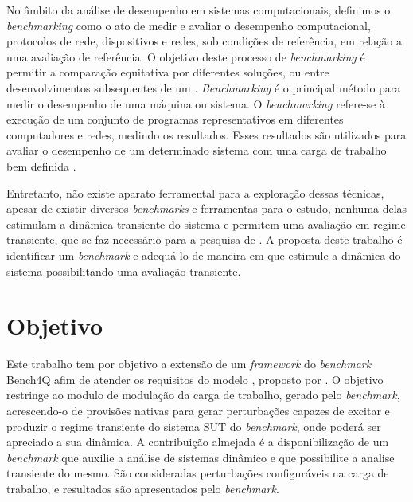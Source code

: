 No âmbito da análise de desempenho em sistemas computacionais, definimos o \textit{benchmarking} como o ato de medir e avaliar o desempenho computacional, protocolos de rede, dispositivos e redes, sob condições de referência, em relação a uma avaliação de referência. O objetivo deste processo de \textit{benchmarking} é permitir a comparação equitativa por diferentes soluções, ou entre desenvolvimentos subsequentes de um \textit{}. \textit{Benchmarking} é o principal método para medir o desempenho de uma máquina ou sistema. O \textit{benchmarking} refere-se à execução de um conjunto de programas representativos em diferentes computadores e redes, medindo os resultados. Esses resultados são utilizados para avaliar o desempenho de um determinado sistema com uma carga de trabalho bem definida \cite{Menasce2001}.

Entretanto, não existe aparato ferramental para a exploração dessas técnicas, apesar de existir diversos \textit{benchmarks} e ferramentas para o estudo, nenhuma delas estimulam a dinâmica transiente do sistema e permitem uma avaliação em regime transiente, que se faz necessário para a pesquisa de . A proposta deste trabalho é identificar um \textit{benchmark} e adequá-lo de maneira em que estimule a dinâmica do sistema possibilitando uma avaliação transiente.


\section{Objetivo}
Este trabalho tem por objetivo a extensão de um \textit{framework} do \textit{benchmark} Bench4Q afim de atender os requisitos do modelo \textit{}, proposto por . O objetivo restringe ao modulo de modulação da carga de trabalho, gerado pelo \textit{benchmark}, acrescendo-o de provisões nativas para gerar perturbações capazes de excitar e produzir o regime transiente do sistema SUT do \textit{benchmark}, onde poderá ser apreciado a sua dinâmica. A contribuição almejada é a disponibilização de um \textit{benchmark} que auxilie a análise de sistemas dinâmico e que possibilite a analise transiente do mesmo. São consideradas perturbações configuráveis na carga de trabalho, e resultados são apresentados pelo \textit{benchmark}.


